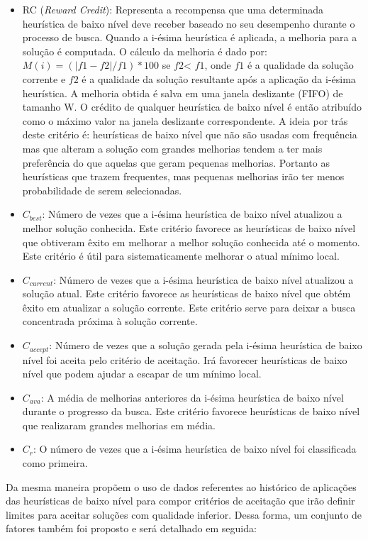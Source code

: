 \begin{itemize}
	\item RC (\textit{Reward Credit}): Representa a recompensa que uma determinada heurística de baixo nível deve receber baseado no seu desempenho durante o processo de busca. Quando a i-ésima heurística é aplicada, a melhoria para a solução é computada. O cálculo da melhoria é dado por: $M(i) = (|f1 -f2|/f1) *100$ se $f2$< $f1$, onde $f1$ é a qualidade da solução corrente e $f2$ é a qualidade da solução resultante após a aplicação da i-ésima heurística. 
	A melhoria obtida é salva em uma janela deslizante (FIFO) de tamanho W. O crédito de qualquer heurística de baixo nível é então atribuído como o máximo valor na janela deslizante correspondente. A ideia por trás deste critério é: heurísticas de baixo nível que não são usadas com frequência mas que alteram a solução com grandes melhorias tendem a ter mais preferência do que aquelas que geram pequenas melhorias. Portanto as heurísticas que trazem frequentes, mas pequenas melhorias irão ter menos probabilidade de serem selecionadas.
	\item $C_{best}$: Número de vezes que a i-ésima heurística de baixo nível atualizou a melhor solução conhecida. Este critério favorece as heurísticas de baixo nível que obtiveram êxito em melhorar a melhor solução conhecida até o momento. Este critério é útil para sistematicamente melhorar o atual mínimo local.
	\item $C_{current}$: Número de vezes que a i-ésima heurística de baixo nível atualizou a solução atual. Este critério favorece as heurísticas de baixo nível que obtém êxito em atualizar a solução corrente. Este critério serve para deixar a busca concentrada próxima à solução corrente.
	\item $C_{accept}$: Número de vezes que a solução gerada pela i-ésima heurística de baixo nível foi aceita pelo critério de aceitação. Irá favorecer heurísticas de baixo nível que podem ajudar a escapar de um mínimo local.
	\item $C_{ava}$: A média de melhorias anteriores da i-ésima heurística de baixo nível durante o progresso da busca. Este critério favorece heurísticas de baixo nível que realizaram grandes melhorias em média.
	\item $C_r$: O número de vezes que a i-ésima heurística de baixo nível foi classificada como primeira.  
\end{itemize} 

Da mesma maneira \cite{sabar2015automatic} propõem o uso de dados referentes ao histórico de aplicações das heurísticas de baixo nível para compor critérios de aceitação que irão definir limites para aceitar soluções com qualidade inferior. Dessa forma, um conjunto de fatores também foi proposto e será detalhado em seguida:



